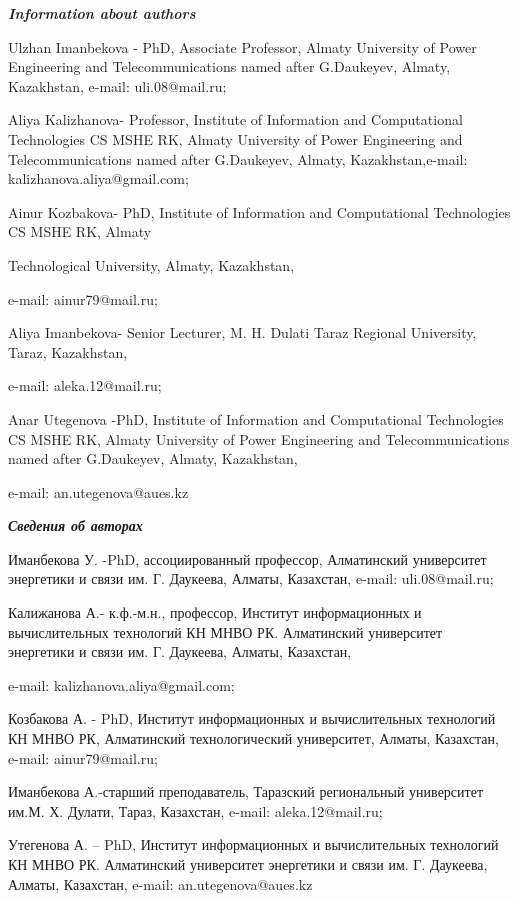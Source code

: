 \emph{{\bfseries Information about authors}}

\begin{noparindent}
Ulzhan Imanbekova - PhD, Associate Professor, Almaty University of Power
Engineering and Telecommunications named after G.Daukeyev, Almaty,
Kazakhstan, e-mail: uli.08@mail.ru;

Aliya Kalizhanova- Professor, Institute of Information and Computational
Technologies CS MSHE RK, Almaty University of Power Engineering and
Telecommunications named after G.Daukeyev, Almaty, Kazakhstan,e-mail:
kalizhanova.aliya@gmail.com;

Ainur Kozbakova- PhD, Institute of Information and Computational
Technologies CS MSHE RK, Almaty

Technological University, Almaty,
Kazakhstan,

e-mail: ainur79@mail.ru;

Aliya Imanbekova- Senior Lecturer, M. H. Dulati Taraz Regional
University, Taraz, Kazakhstan,

e-mail: aleka.12@mail.ru;

Anar Utegenova -PhD, Institute of Information and Computational
Technologies CS MSHE RK, Almaty University of Power Engineering and
Telecommunications named after G.Daukeyev, Almaty, Kazakhstan,

e-mail: an.utegenova@aues.kz
\end{noparindent}

\emph{{\bfseries Сведения об авторах}}

\begin{noparindent}
Иманбекова У. -PhD, ассоциированный профессор, Алматинский университет
энергетики и связи им. Г. Даукеева, Алматы, Казахстан, e-mail:
uli.08@mail.ru;

Калижанова А.- к.ф.-м.н., профессор, Институт информационных и
вычислительных технологий КН МНВО РК. Алматинский университет энергетики
и связи им. Г. Даукеева, Алматы, Казахстан,

e-mail: kalizhanova.aliya@gmail.com;

Козбакова А. - PhD, Институт информационных и вычислительных технологий
КН МНВО РК, Алматинский технологический университет, Алматы, Казахстан,
e-mail: ainur79@mail.ru;

Иманбекова А.-старший преподаватель, Таразский региональный университет
им.М. Х. Дулати, Тараз, Казахстан, e-mail: aleka.12@mail.ru;

Утегенова А. -- PhD, Институт информационных и вычислительных технологий
КН МНВО РК. Алматинский университет энергетики и связи им. Г. Даукеева,
Алматы, Казахстан, e-mail: an.utegenova@aues.kz
\end{noparindent}
